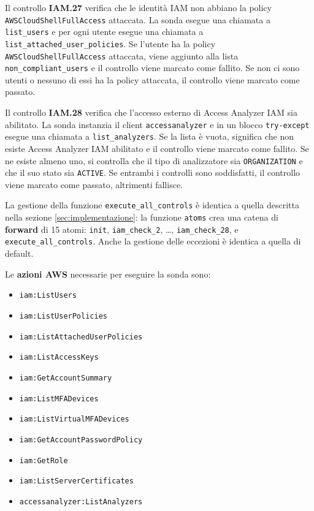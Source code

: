 Il controllo \textbf{IAM.27} verifica che le identità IAM non abbiano la policy \texttt{AWSCloudShellFullAccess} attaccata. La sonda esegue una chiamata a \texttt{list\_users} e per ogni utente esegue una chiamata a \texttt{list\_attached\_user\_policies}. Se l'utente ha la policy \texttt{AWSCloudShellFullAccess} attaccata, viene aggiunto alla lista \texttt{non\_compliant\_users} e il controllo viene marcato come fallito. Se non ci sono utenti o nessuno di essi ha la policy attaccata, il controllo viene marcato come passato.

Il controllo \textbf{IAM.28} verifica che l'accesso esterno di Access Analyzer IAM sia abilitato. La sonda instanzia il client \texttt{accessanalyzer} e in un blocco \texttt{try-except} esegue una chiamata a \texttt{list\_analyzers}. Se la lista è vuota, significa che non esiste Access Analyzer IAM abilitato e il controllo viene marcato come fallito. Se ne esiste almeno uno, si controlla che il tipo di analizzatore sia \texttt{ORGANIZATION} e che il suo stato sia \texttt{ACTIVE}. Se entrambi i controlli sono soddisfatti, il controllo viene marcato come passato, altrimenti fallisce.

La gestione della funzione \texttt{execute\_all\_controls} è identica a quella descritta nella sezione \ref{sec:implementazione}: la funzione \texttt{atoms} crea una catena di \textbf{forward} di 15 atomi: \texttt{init}, \texttt{iam\_check\_2}, \dots, \texttt{iam\_check\_28}, e \texttt{execute\_all\_controls}. Anche la gestione delle eccezioni è identica a quella di default.

Le \textbf{azioni AWS} necessarie per eseguire la sonda sono:
\begin{itemize}
    \item \texttt{iam:ListUsers}
    \item \texttt{iam:ListUserPolicies}
    \item \texttt{iam:ListAttachedUserPolicies}
    \item \texttt{iam:ListAccessKeys}
    \item \texttt{iam:GetAccountSummary}
    \item \texttt{iam:ListMFADevices}
    \item \texttt{iam:ListVirtualMFADevices}
    \item \texttt{iam:GetAccountPasswordPolicy}
    \item \texttt{iam:GetRole}
    \item \texttt{iam:ListServerCertificates}
    \item \texttt{accessanalyzer:ListAnalyzers}
\end{itemize}

